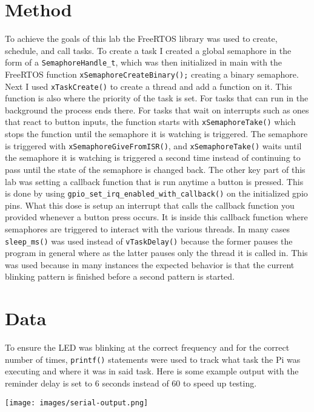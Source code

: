 \documentclass[sigconf]{article}
\begin{document}
\section*{Method}

To achieve the goals of this lab the FreeRTOS library was used to create, schedule, and call tasks. To create a task I created a global semaphore in the form of a \lstinline{SemaphoreHandle_t}, which was then initialized in main with the FreeRTOS function \lstinline{xSemaphoreCreateBinary();} creating a binary semaphore. Next I used \lstinline{xTaskCreate()} to create a thread and add a function on it. This function is also where the priority of the task is set. For tasks that can run in the background the process ends there. For tasks that wait on interrupts such as ones that react to button inputs, the function starts with \lstinline{xSemaphoreTake()} which stops the function until the semaphore it is watching is triggered. The semaphore is triggered with \lstinline{xSemaphoreGiveFromISR()}, and \lstinline{xSemaphoreTake()} waits until the semaphore it is watching is triggered a second time instead of continuing to pass until the state of the semaphore is changed back. The other key part of this lab was setting a callback function that is run anytime a button is pressed. This is done by using \lstinline{gpio_set_irq_enabled_with_callback()} on the initialized gpio pins. What this dose is setup an interrupt that calls the callback function you provided whenever a button press occurs. It is inside this callback function where semaphores are triggered to interact with the various threads. In many cases \lstinline{sleep_ms()} was used instead of \lstinline{vTaskDelay()} because the former pauses the program in general where as the latter pauses only the thread it is called in. This was used because in many instances the expected behavior is that the current blinking pattern is finished before a second pattern is started.


\section*{Data}

To ensure the LED was blinking at the correct frequency and for the correct number of times, \lstinline{printf()} statements were used to track what task the Pi was executing and where it was in said task. Here is some example output with the reminder delay is set to 6 seconds instead of 60 to speed up testing.

\texttt{[image: images/serial-output.png]}
\end{document}

